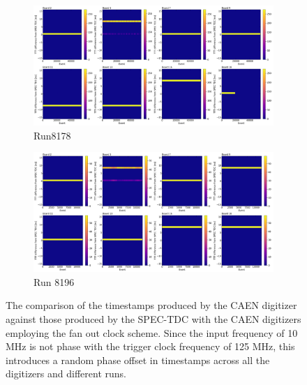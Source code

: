 \begin{figure}[htbp!]
\begin{subfigure}[h]{1.00\linewidth}
\centering    
\includegraphics[width=\linewidth]{TTT_SPEC_diff_run8178}
\caption{Run8178}
\end{subfigure}
\hfill
\begin{subfigure}[h]{1.00\linewidth}
\centering    
\includegraphics[width=\linewidth]{TTT_SPEC_diff_run8196}
\caption{Run 8196}
\end{subfigure}%
\caption[fanoutSPEC]{
The comparison of the timestamps produced by the CAEN digitizer against those produced by the SPEC-TDC with the CAEN digitizers employing the fan out clock scheme.
Since the input frequency of 10 MHz is not phase with the trigger clock frequency of 125 MHz, this introduces a random phase offset in timestamps across all the digitizers and different runs. 
}
\label{fig:fanoutSPEC}
\end{figure}

